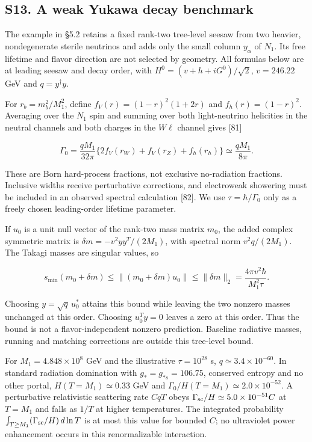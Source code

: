 \documentclass[
]{article}
\begin{document}
\clearpage

\subsection{S13. A weak Yukawa decay
benchmark}\label{s13.-a-weak-yukawa-decay-benchmark}

The example in §5.2 retains a fixed rank-two tree-level seesaw from two
heavier, nondegenerate sterile neutrinos and adds only the small column
\(y_\alpha\) of \(N_1\). Its free lifetime and flavor direction are not
selected by geometry. All formulas below are at leading seesaw and decay
order, with \(H^0=(v+h+iG^0)/\sqrt2\), \(v=246.22\) GeV and
\(q=y^\dagger y\).

For \(r_b=m_b^2/M_1^2\), define \(f_V(r)=(1-r)^2(1+2r)\) and
\(f_h(r)=(1-r)^2\). Averaging over the \(N_1\) spin and summing over
both light-neutrino helicities in the neutral channels and both charges
in the \(W\ell\) channel gives {[}81{]}

\[
\Gamma_0=\frac{qM_1}{32\pi}\{2f_V(r_W)+f_V(r_Z)+f_h(r_h)\}
\simeq\frac{qM_1}{8\pi}.
\]

These are Born hard-process fractions, not exclusive no-radiation
fractions. Inclusive widths receive perturbative corrections, and
electroweak showering must be included in an observed spectral
calculation {[}82{]}. We use \(\tau=\hbar/\Gamma_0\) only as a freely
chosen leading-order lifetime parameter.

If \(u_0\) is a unit null vector of the rank-two mass matrix \(m_0\),
the added complex symmetric matrix is \(\delta m=-v^2yy^T/(2M_1)\), with
spectral norm \(v^2q/(2M_1)\). The Takagi masses are singular values, so

\[
s_{\min}(m_0+\delta m)\leq\|(m_0+\delta m)u_0\|
\leq\|\delta m\|_2=\frac{4\pi v^2\hbar}{M_1^2\tau}.
\]

Choosing \(y=\sqrt q\,u_0^*\) attains this bound while leaving the two
nonzero masses unchanged at this order. Choosing \(u_0^Ty=0\) leaves a
zero at this order. Thus the bound is not a flavor-independent nonzero
prediction. Baseline radiative masses, running and matching corrections
are outside this tree-level bound.

For \(M_1=4.848\times10^8\) GeV and the illustrative \(\tau=10^{28}\) s,
\(q\simeq3.4\times10^{-60}\). In standard radiation domination with
\(g_*=g_{*s}=106.75\), conserved entropy and no other portal,
\(H(T=M_1)\simeq0.33\) GeV and
\(\Gamma_0/H(T=M_1)\simeq2.0\times10^{-52}\). A perturbative
relativistic scattering rate \(CqT\) obeys
\(\Gamma_{\rm sc}/H\simeq5.0\times10^{-51}C\) at \(T=M_1\) and falls as
\(1/T\) at higher temperatures. The integrated probability
\(\int_{T\geq M_1}(\Gamma_{\rm sc}/H)\,d\ln T\) is at most this value
for bounded \(C\); no ultraviolet power enhancement occurs in this
renormalizable interaction.
\end{document}
